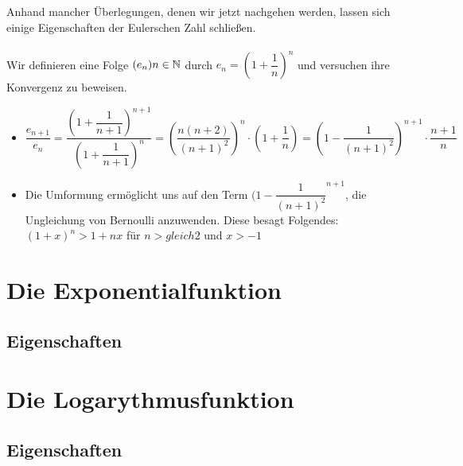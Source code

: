 Anhand mancher Überlegungen, denen wir jetzt nachgehen werden, lassen sich einige Eigenschaften der Eulerschen Zahl schließen.\\
\\ Wir definieren eine Folge $(e_{n})n\in\mathbb{N}$ durch $e_{n}=(1+\dfrac{1}{n})^n$ und versuchen ihre Konvergenz zu beweisen.
\begin{itemize}
\item$\dfrac{e_{n+1}}{e_{n}}=\dfrac{{(1+\dfrac{1}{n+1})}^{n+1}}{{(1+\dfrac{1}{n+1})}^{n}}=(\dfrac{n(n+2)}{(n+1)^2})^n\cdot(1+\dfrac{1}{n})=(1-\dfrac{1}{(n+1)^2})^{n+1}\cdot\dfrac{n+1}{n}$
\item Die Umformung ermöglicht uns auf den Term ${(1-\dfrac{1}{(n+1)^2}}^{n+1}$, die Ungleichung von Bernoulli anzuwenden. Diese besagt Folgendes: $(1+x)^n>1+nx$ für $n>gleich2$ und $x>-1$

\end{itemize}

		\section{Die Exponentialfunktion}

	\subsection{Eigenschaften}

		\section{Die Logarythmusfunktion}

	\subsection{Eigenschaften}

